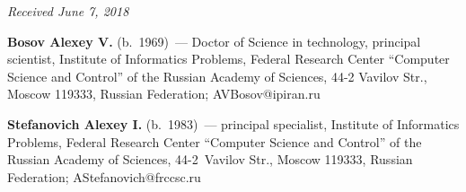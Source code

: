 \vspace*{-6pt}

\hfill{\small\textit{Received June 7, 2018}}


     
     \Contr
     
\noindent
\textbf{Bosov Alexey V.} (b.\ 1969)~--- Doctor of Science in technology, 
principal scientist, Institute of Informatics Problems, Federal Research 
Center ``Computer Science and Control'' of the Russian Academy of Sciences, 
44-2 Vavilov Str., Moscow 119333, Russian Federation; 
\mbox{AVBosov@ipiran.ru}

\vspace*{3pt}

\noindent
\textbf{Stefanovich Alexey I.} (b.\ 1983)~--- principal specialist, Institute of Informatics Problems, 
Federal Research Center ``Computer Science and Control'' of the Russian Academy of Sciences,  
44-2~Vavilov Str., Moscow 119333, Russian Federation; \mbox{AStefanovich@frccsc.ru}
\label{end\stat}

\renewcommand{\bibname}{\protect\rm Литература}       

      